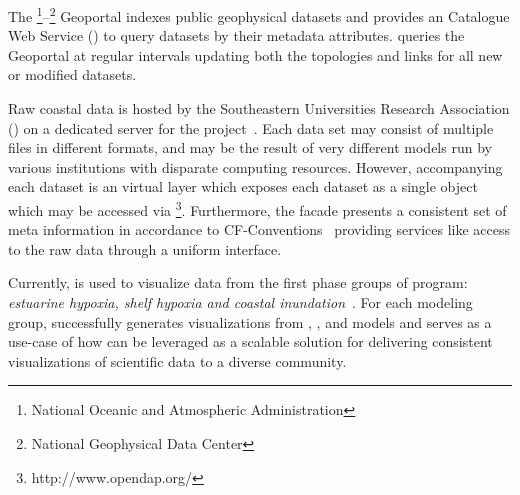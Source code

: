 The \noaa{}\footnote{National Oceanic and Atmospheric
  Administration}--\ngdc{}\footnote{National Geophysical Data Center}
Geoportal indexes public geophysical datasets and provides an \ogc{}
Catalogue Web Service (\csw{}) to query datasets by their metadata
attributes. \sciwms{} queries the \ngdc{} Geoportal at regular intervals
updating both the topologies and \opendap{} links for all new or
modified datasets.

Raw coastal data is hosted by the Southeastern Universities Research
Association (\sura{}) on a dedicated server for the \comt{}
project~\cite{luettich12}. Each data set may consist of multiple files
in different formats, and may be the result of very different models
run by various institutions with disparate computing
resources. However, accompanying each dataset is an \ncml{} virtual
layer which exposes each dataset as a single \netcdf{} object which
may be accessed via
\opendap{}\footnote{http://www.opendap.org/}. Furthermore, the \ncml{}
facade presents a consistent set of meta information in accordance to
CF-Conventions~\cite{cf} providing services like \sciwms{} access to
the raw data through a uniform interface.

Currently, \Sciwms{} is used to visualize data from the first phase
groups of \ioos{} \comt{} program: {\em estuarine hypoxia, shelf hypoxia and
  coastal inundation}~\cite{luettich13}. For each modeling group,
\sciwms{} successfully generates visualizations from \adcirc{},
\fvcom{}, \selfe{} and \slosh{} models and serves as a use-case of how
\sciwms{} can be leveraged as a scalable solution for delivering
consistent visualizations of scientific data to a diverse community.
